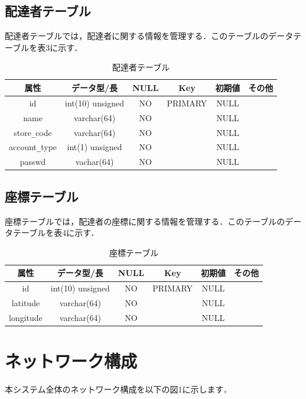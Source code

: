 \documentclass[a4j,titlepage]{jarticle}
\begin{document}
\subsection{配達者テーブル}
配達者テーブルでは，配達者に関する情報を管理する．このテーブルのデータテーブルを表3に示す．
\begin{table}[htbp]
\begin{center}
 \caption{配達者テーブル}
  \begin{tabular}{|c|c|c|c|c|c|}\hline
    属性 & データ型/長 & NULL & Key & 初期値 & その他\\ \hline \hline
    id & int(10) unsigned & NO & PRIMARY & NULL & \\ \hline
    name & varchar(64) & NO &  & NULL & \\ \hline
    store\verb|_|code & varchar(64) & NO &  & NULL & \\ \hline
    account\verb|_|type & int(1) unsigned & NO &  & NULL & \\ \hline
    passwd & vachar(64) & NO &  & NULL & \\ \hline
  \end{tabular}
\end{center}
\end{table}


\subsection{座標テーブル}
座標テーブルでは，配達者の座標に関する情報を管理する．このテーブルのデータテーブルを表4に示す．
\begin{table}[htbp]
\begin{center}
 \caption{座標テーブル}
  \begin{tabular}{|c|c|c|c|c|c|}\hline
    属性 & データ型/長 & NULL & Key & 初期値 & その他\\ \hline \hline
    id & int(10) unsigned & NO & PRIMARY & NULL & \\ \hline
    latitude & varchar(64) & NO &  & NULL & \\ \hline
    longitude & varchar(64) & NO &  & NULL & \\ \hline
  \end{tabular}
\end{center}
\end{table}

\section{ネットワーク構成}
本システム全体のネットワーク構成を以下の図1に示します．
\end{document}
